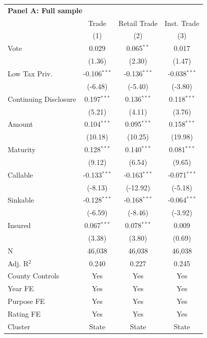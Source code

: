 \begingroup
\centering
\begin{tabular*}{\textwidth}{@{\extracolsep{\fill}}lccc}
\multicolumn{5}{l}{\textbf{Panel A: Full sample}}\\

\addlinespace
   \toprule
                         & Trade          & Retail Trade   & Inst. Trade\\  
                         & (1)            & (2)            & (3)\\  
   \midrule 
   Vote                  & 0.029          & 0.065$^{**}$   & 0.017\\   
                         & (1.36)        & (2.30)        & (1.47)\\   
   Low Tax Priv.         & -0.106$^{***}$ & -0.136$^{***}$ & -0.038$^{***}$\\   
                         & (-6.48)       & (-5.40)       & (-3.80)\\   
   Continuing Disclosure & 0.197$^{***}$  & 0.136$^{***}$  & 0.118$^{***}$\\   
                         & (5.21)        & (4.11)        & (3.76)\\   
   Amount                & 0.104$^{***}$  & 0.095$^{***}$  & 0.158$^{***}$\\   
                         & (10.18)       & (10.25)       & (19.98)\\   
   Maturity              & 0.128$^{***}$  & 0.140$^{***}$  & 0.081$^{***}$\\   
                         & (9.12)        & (6.54)        & (9.65)\\   
   Callable              & -0.133$^{***}$ & -0.163$^{***}$ & -0.071$^{***}$\\   
                         & (-8.13)       & (-12.92)      & (-5.18)\\   
   Sinkable              & -0.128$^{***}$ & -0.168$^{***}$ & -0.064$^{***}$\\   
                         & (-6.59)       & (-8.46)       & (-3.92)\\   
   Insured               & 0.067$^{***}$  & 0.078$^{***}$  & 0.009\\   
                         & (3.38)        & (3.80)        & (0.69)\\   
   \hline
   N          & 46,038         & 46,038         & 46,038\\  
   Adj. R$^2$        & 0.240          & 0.227          & 0.245\\  
   County Controls       & Yes            & Yes            & Yes\\  
   Year FE               & Yes            & Yes            & Yes\\  
   Purpose FE            & Yes            & Yes            & Yes\\  
   Rating FE             & Yes            & Yes            & Yes\\  
   Cluster              & State & State & State\\  
   \bottomrule
\end{tabular*}
\par\endgroup

